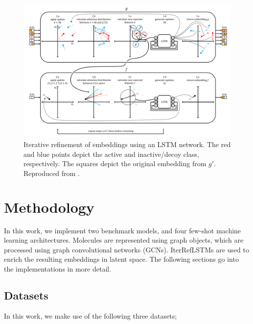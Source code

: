 \documentclass[journal=acscii,manuscript=article]{achemso}
\begin{document}
\begin{figure}[h]
\centering
\includegraphics[width=\linewidth]{img/iterreflstm.png}
\caption{Iterative refinement of embeddings using an LSTM network. The red and blue points depict the active and inactive/decoy class, respectively. The squares depict the original embedding from $g'$. Reproduced from \citet{altae2017low}.}
\label{fig:iterreflstm}
\end{figure}

\section{Methodology}

In this work, we implement two benchmark models, and four few-shot machine learning architectures. Molecules are represented using graph objects, which are processed using graph convolutional networks (GCNs). IterRefLSTMs are used to enrich the resulting embeddings in latent space. The following sections go into the implementations in more detail.

\subsection{Datasets}

In this work, we make use of the following three datasets;
\end{document}
